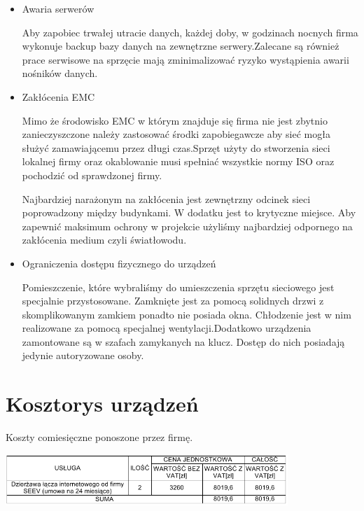 \documentclass{report}
\begin{document}
\begin{itemize}
\item {Awaria serwerów}

Aby zapobiec trwałej utracie danych, każdej doby, w godzinach nocnych firma wykonuje backup bazy danych na
zewnętrzne serwery.Zalecane są również prace serwisowe na  sprzęcie
mają zminimalizować ryzyko wystąpienia awarii nośników danych.

\item {Zakłócenia EMC}

Mimo że środowisko EMC w którym znajduje się firma nie jest zbytnio zanieczyszczone należy zastosować środki zapobiegawcze
aby sieć mogła służyć zamawiającemu przez długi czas.Sprzęt użyty do
stworzenia sieci lokalnej firmy oraz okablowanie musi spełniać wszystkie normy ISO
oraz pochodzić od sprawdzonej firmy.

Najbardziej narażonym na zakłócenia jest zewnętrzny odcinek sieci poprowadzony między budynkami. W dodatku jest to krytyczne miejsce. 
Aby zapewnić maksimum ochrony w projekcie użyliśmy najbardziej odpornego na zakłócenia medium czyli światłowodu.


\item {Ograniczenia dostępu fizycznego do urządzeń}

Pomieszczenie, które wybraliśmy do umieszczenia sprzętu sieciowego jest specjalnie przystosowane.
Zamknięte jest za pomocą solidnych drzwi z skomplikowanym zamkiem ponadto nie posiada okna. Chłodzenie jest w nim
realizowane za pomocą specjalnej wentylacji.Dodatkowo urządzenia zamontowane są w szafach zamykanych na klucz. 
Dostęp do nich posiadają jedynie autoryzowane osoby.

\end{itemize}

\section{Kosztorys urządzeń}

\begin{table}[H]
\caption{Koszty comiesięczne ponoszone przez firmę.}
\label{table:koszty_loncze}
 \centering
      \includegraphics[width=0.8\textwidth]{./obrazki/koszty/koszty_loncze.png}
\end{table}

\end{document}
